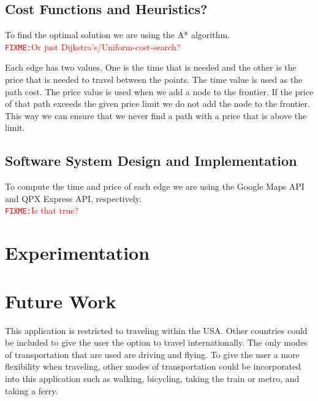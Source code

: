 \documentclass[11pt]{article}
\newcommand{\FIXME}[1]{ \ \\ \hspace* {-1.5 cm}
  \textcolor{red}{\texttt{FIXME:}#1} \medskip\par}
\begin{document}
\subsection{Cost Functions and Heuristics?}
To find the optimal solution we are using the A* algorithm.
\FIXME{Or just Dijkstra's/Uniform-cost-search?}  Each edge has two values. One is the time that is needed and the other is the price that is needed to travel between the points. The time value is used as the path cost. The price value is used when we add a node to the frontier. If the price of that path exceeds the given price limit we do not add the node to the frontier. This way we can ensure that we never find a path with a price that is above the limit.


\subsection{Software System Design and Implementation}
To compute the time and price of each edge we are using the Google Maps API and QPX Express API, respectively. \FIXME{Is that true?} 

\section{Experimentation}



\section{Future Work}
This application is restricted to traveling within the USA. Other countries could be included to give the user the option to travel internationally. The only modes of transportation that are used are driving and flying. To give the user a more flexibility when traveling, other modes of transportation could be incorporated into this application such as walking, bicycling, taking the train or metro, and taking a ferry.
				

\end{document}
